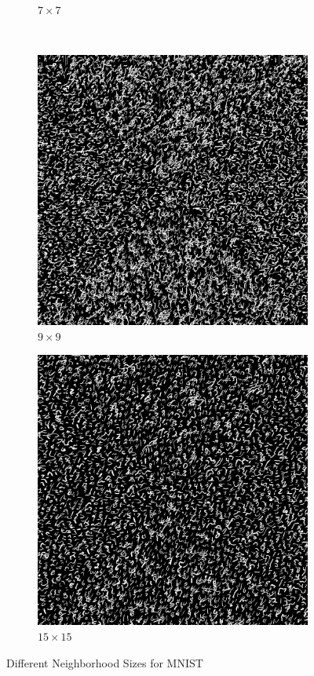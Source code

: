 \documentclass{article}
\begin{document}
\begin{figure}[H]
\begin{subfigure}{0.4\textwidth}
        \caption{$7 \times 7$}
        \label{fig:mnist-patch-7}
    \end{subfigure}
    \\
    \begin{subfigure}{0.4\textwidth}
        \centering
        \includegraphics[width=\linewidth]{../Result/mnist-patch-9.png}
        \caption{$9 \times 9$}
        \label{fig:mnist-patch-9}
    \end{subfigure}
    \begin{subfigure}{0.4\textwidth}
        \centering
        \includegraphics[width=\linewidth]{../Result/mnist-patch-15.png}
        \caption{$15 \times 15$}
        \label{fig:mnist-patch-15}
    \end{subfigure}
    \caption{Different Neighborhood Sizes for MNIST}
    \label{fig:mnist-diff-patch}
\end{figure}
\end{document}
